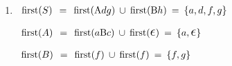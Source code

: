 \documentclass[11pt]{article}
\begin{document}

  \begin{enumerate}

    \addtolength{\itemsep}{12mm}

      \item \(
              \begin{array}{lcl}
                \mathrm{first}(S)
                  & \hspace{-1mm}=\hspace{-1mm}
                  & \mathrm{first}(\mathrm{A}dg) \: \cup \:
                    \mathrm{first}(\mathrm{B}h) \: = \: \{a, d, f, g\}
                  \\
              \end{array}
            \)

            \smallskip

            \(
              \begin{array}{lcl}
                \mathrm{first}(A)
                  & \hspace{-1mm}=\hspace{-1mm}
                  & \mathrm{first}(a\mathrm{B}c) \: \cup \:
                    \mathrm{first}(\mbox{\Large \ensuremath{\epsilon}}) \: = \: \{a, \mbox{\Large \ensuremath{\epsilon}}\}
                  \\
              \end{array}
            \)

            \smallskip

            \(
              \begin{array}{lcl}
                \mathrm{first}(B)
                  & \hspace{-1mm}=\hspace{-1mm}
                  & \mathrm{first}(f) \: \cup \: \mathrm{first}(f) \: = \:
                    \{f, g\}
                  \\
              \end{array}
            \)

            \vspace{6mm}

\end{enumerate}
\end{document}
